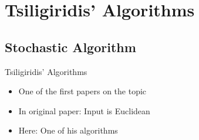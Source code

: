\section{Tsiligiridis' Algorithms}

\subsection{Stochastic Algorithm}

\begin{frame}{Tsiligiridis' Algorithms}


	\begin{itemize}
		\item<1-> One of the first papers on the topic \cite{tsiligiridis_heuristic_1984}
		\item<2-> In original paper: Input is Euclidean
		\item<3-> Here: One of his algorithms
	\end{itemize}
\end{frame}

